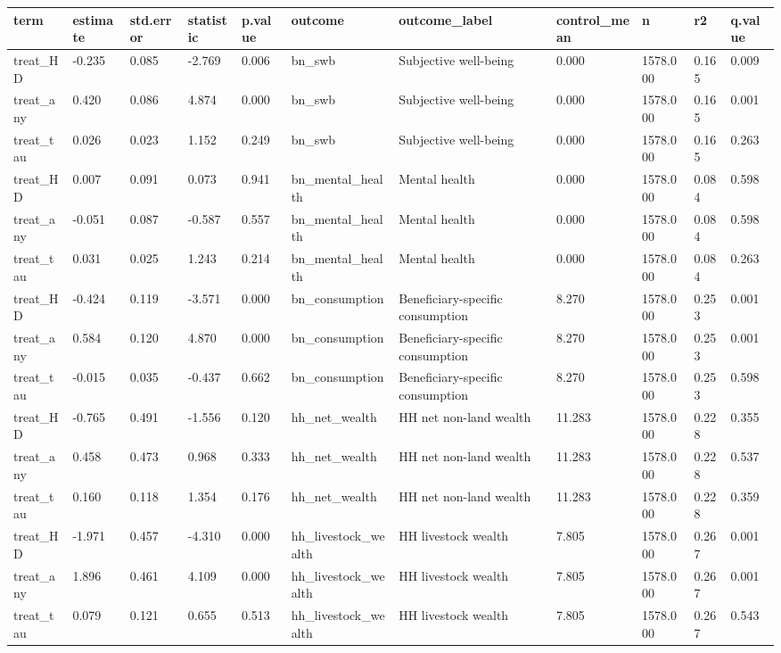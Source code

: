 \begin{tabular}{lllllllllll}
\toprule
term & estimate & std.error & statistic & p.value & outcome & outcome\_label & control\_mean & n & r2 & q.value
 \\
\midrule
treat\_HD & -0.235 & 0.085 & -2.769 & 0.006 & bn\_swb & Subjective well-being & 0.000 & 1578.000 & 0.165 & 0.009 \\
treat\_any & 0.420 & 0.086 & 4.874 & 0.000 & bn\_swb & Subjective well-being & 0.000 & 1578.000 & 0.165 & 0.001 \\
treat\_tau & 0.026 & 0.023 & 1.152 & 0.249 & bn\_swb & Subjective well-being & 0.000 & 1578.000 & 0.165 & 0.263 \\
treat\_HD & 0.007 & 0.091 & 0.073 & 0.941 & bn\_mental\_health & Mental health & 0.000 & 1578.000 & 0.084 & 0.598 \\
treat\_any & -0.051 & 0.087 & -0.587 & 0.557 & bn\_mental\_health & Mental health & 0.000 & 1578.000 & 0.084 & 0.598 \\
treat\_tau & 0.031 & 0.025 & 1.243 & 0.214 & bn\_mental\_health & Mental health & 0.000 & 1578.000 & 0.084 & 0.263 \\
treat\_HD & -0.424 & 0.119 & -3.571 & 0.000 & bn\_consumption & Beneficiary-specific consumption & 8.270 & 1578.000 & 0.253 & 0.001 \\
treat\_any & 0.584 & 0.120 & 4.870 & 0.000 & bn\_consumption & Beneficiary-specific consumption & 8.270 & 1578.000 & 0.253 & 0.001 \\
treat\_tau & -0.015 & 0.035 & -0.437 & 0.662 & bn\_consumption & Beneficiary-specific consumption & 8.270 & 1578.000 & 0.253 & 0.598 \\
treat\_HD & -0.765 & 0.491 & -1.556 & 0.120 & hh\_net\_wealth & HH net non-land wealth & 11.283 & 1578.000 & 0.228 & 0.355 \\
treat\_any & 0.458 & 0.473 & 0.968 & 0.333 & hh\_net\_wealth & HH net non-land wealth & 11.283 & 1578.000 & 0.228 & 0.537 \\
treat\_tau & 0.160 & 0.118 & 1.354 & 0.176 & hh\_net\_wealth & HH net non-land wealth & 11.283 & 1578.000 & 0.228 & 0.359 \\
treat\_HD & -1.971 & 0.457 & -4.310 & 0.000 & hh\_livestock\_wealth & HH livestock wealth & 7.805 & 1578.000 & 0.267 & 0.001 \\
treat\_any & 1.896 & 0.461 & 4.109 & 0.000 & hh\_livestock\_wealth & HH livestock wealth & 7.805 & 1578.000 & 0.267 & 0.001 \\
treat\_tau & 0.079 & 0.121 & 0.655 & 0.513 & hh\_livestock\_wealth & HH livestock wealth & 7.805 & 1578.000 & 0.267 & 0.543 \\

\end{tabular}
